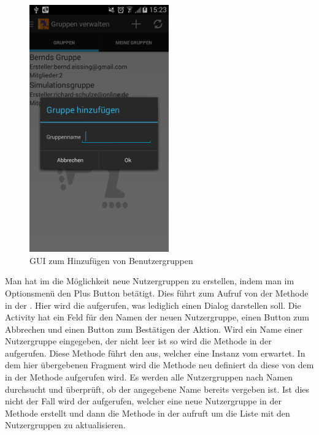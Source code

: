 
\begin{figure}[htb]
\centering
\includegraphics[width=6cm]{graphics/Nutzergruppen_neue_erstellen.png}
\caption{GUI zum Hinzufügen von Benutzergruppen}
\label{fig:usergroups_hinzufuegen}
\end{figure}

Man  hat im  die Möglichkeit neue Nutzergruppen zu erstellen, indem man im Optionsmenü den Plus Button betätigt. Dies führt zum Aufruf von der  Methode in der  . Hier wird die  aufgerufen, was lediglich einen Dialog darstellen soll. Die Activity hat ein Feld für den Namen der neuen Nutzergruppe, einen Button zum Abbrechen und einen Button zum Bestätigen der Aktion. Wird ein Name einer Nutzergruppe eingegeben, der nicht leer ist so wird die  Methode in der  aufgerufen. Diese Methode führt den  aus, welcher eine Instanz vom  erwartet. In dem hier übergebenen Fragment wird die  Methode neu definiert da diese von dem  in der  Methode aufgerufen wird. Es werden alle Nutzergruppen nach Namen durchsucht und überprüft, ob der angegebene Name bereits vergeben ist. Ist dies nicht der Fall wird der  aufgerufen, welcher eine neue Nutzergruppe in der  Methode erstellt und dann die  Methode in der  aufruft um die Liste mit den Nutzergruppen zu aktualisieren.
\FloatBarrier

